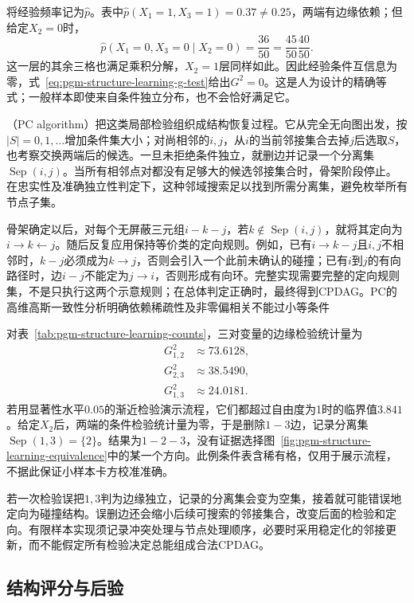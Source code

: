 将经验频率记为$\widehat p$。表中$\widehat p(X_1=1,X_3=1)=0.37\ne0.25$，两端有边缘依赖；但给定$X_2=0$时，
\[
  \widehat p(X_1=0,X_3=0\mid X_2=0)
  =\frac{36}{50}=\frac{45}{50}\frac{40}{50}.
\]
这一层的其余三格也满足乘积分解，$X_2=1$层同样如此。因此经验条件互信息为零，式~\eqref{eq:pgm-structure-learning-g-test}给出$G^2=0$。这是人为设计的精确等式；一般样本即使来自条件独立分布，也不会恰好满足它。

（PC algorithm）把这类局部检验组织成结构恢复过程。它从完全无向图出发，按$|S|=0,1,\ldots$增加条件集大小；对尚相邻的$i,j$，从$i$的当前邻接集合去掉$j$后选取$S$，也考察交换两端后的候选。一旦未拒绝条件独立，就删边并记录一个分离集$\operatorname{Sep}(i,j)$。当所有相邻点对都没有足够大的候选邻接集合时，骨架阶段停止。在忠实性及准确独立性判定下，这种邻域搜索足以找到所需分离集，避免枚举所有节点子集。

骨架确定以后，对每个无屏蔽三元组$i-k-j$，若$k\notin\operatorname{Sep}(i,j)$，就将其定向为$i\to k\leftarrow j$。随后反复应用保持等价类的定向规则。例如，已有$i\to k-j$且$i,j$不相邻时，$k-j$必须成为$k\to j$，否则会引入一个此前未确认的碰撞；已有$i$到$j$的有向路径时，边$i-j$不能定为$j\to i$，否则形成有向环。完整实现需要完整的定向规则集，不是只执行这两个示意规则；在总体判定正确时，最终得到CPDAG。PC的高维高斯一致性分析明确依赖稀疏性及非零偏相关不能过小等条件

对表~\ref{tab:pgm-structure-learning-counts}，三对变量的边缘检验统计量为
\[
  \begin{aligned}
    G^2_{1,2}&\approx73.6128,\\
    G^2_{2,3}&\approx38.5490,\\
    G^2_{1,3}&\approx24.0181.
  \end{aligned}
\]
若用显著性水平$0.05$的渐近检验演示流程，它们都超过自由度为1时的临界值$3.841$。给定$X_2$后，两端的条件检验统计量为零，于是删除$1-3$边，记录分离集$\operatorname{Sep}(1,3)=\{2\}$。结果为$1-2-3$，没有证据选择图~\ref{fig:pgm-structure-learning-equivalence}中的某一个方向。此例条件表含稀有格，仅用于展示流程，不据此保证小样本卡方校准准确。

若一次检验误把$1,3$判为边缘独立，记录的分离集会变为空集，接着就可能错误地定向为碰撞结构。误删边还会缩小后续可搜索的邻接集合，改变后面的检验和定向。有限样本实现须记录冲突处理与节点处理顺序，必要时采用稳定化的邻接更新，而不能假定所有检验决定总能组成合法CPDAG。

\subsection{结构评分与后验}
\label{sec:pgm-structure-learning-scores}

